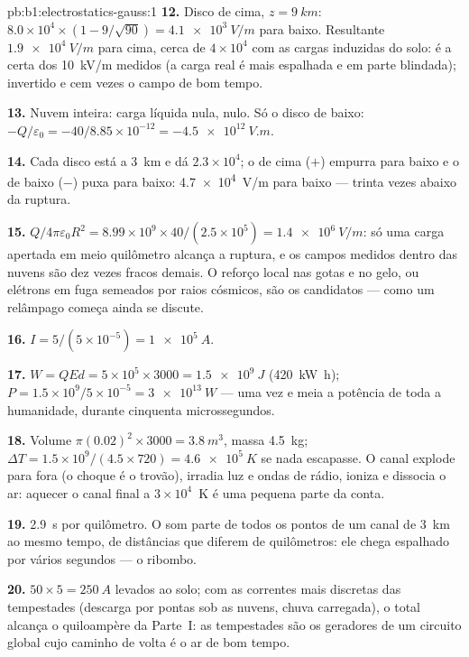 \begin{solution}{pb:b1:electrostatics-gauss:1}
\textbf{12.} Disco de cima, $z = \qty{9}{km}$: $8.0 \times 10^4 \times (1 - 9/\sqrt{90}) =
\qty{4.1e3}{V/m}$ para baixo. Resultante $\qty{1.9e4}{V/m}$ para cima, cerca de $4 \times 10^4$
com as cargas induzidas do solo: é a  certa dos \qty{10}{kV/m}
medidos (a carga real é mais espalhada e em parte blindada);
invertido e cem vezes o campo de bom tempo.

\textbf{13.} Nuvem inteira: carga líquida nula,  nulo. Só o disco de baixo:
$-Q/\varepsilon_0 = -40/8.85 \times 10^{-12} = \qty{-4.5e12}{V.m}$.

\textbf{14.} Cada disco está a \qty{3}{km} e dá $2.3 \times 10^4$; o de
cima ($+$) empurra para baixo e o de baixo ($-$) puxa para baixo: \qty{4.7e4}{V/m}
para baixo --- trinta vezes abaixo da ruptura.

\textbf{15.} $Q/4\pi\varepsilon_0R^2 = 8.99 \times 10^9 \times 40/(2.5 \times 10^5) =
\qty{1.4e6}{V/m}$: só uma carga apertada em meio quilômetro alcança a
ruptura, e os campos medidos dentro das nuvens são dez vezes fracos demais. O reforço
local nas gotas e no gelo, ou elétrons em fuga semeados por raios
cósmicos, são os candidatos --- como um relâmpago começa ainda se discute.

\textbf{16.} $I = 5/(5 \times 10^{-5}) = \qty{1e5}{A}$.

\textbf{17.} $W = QEd = 5 \times 10^5 \times 3000 = \qty{1.5e9}{J}$ (\qty{420}{kW h});
$P = 1.5 \times 10^9/5 \times 10^{-5} = \qty{3e13}{W}$ --- uma vez e meia
a potência de toda a humanidade, durante cinquenta microssegundos.

\textbf{18.} Volume $\pi(0.02)^2 \times 3000 = \qty{3.8}{m^3}$, massa \qty{4.5}{kg};
$\Delta T = 1.5 \times 10^9/(4.5 \times 720) = \qty{4.6e5}{K}$ se nada escapasse.
O canal explode para fora (o choque é o trovão), irradia luz
e ondas de rádio, ioniza e dissocia o ar: aquecer o canal final
a $3 \times 10^4$~K é uma pequena parte da conta.

\textbf{19.} \qty{2.9}{s} por quilômetro. O som parte de todos os pontos de um
canal de \qty{3}{km} ao mesmo tempo, de distâncias que diferem de quilômetros: ele
chega espalhado por vários segundos --- o ribombo.

\textbf{20.} $50 \times 5 = \qty{250}{A}$ levados ao solo; com as
correntes mais discretas das tempestades (descarga por pontas sob as nuvens, chuva carregada), o
total alcança o quiloampère da Parte~I: as tempestades são os geradores de um
circuito global cujo caminho de volta é o ar de bom tempo.


\end{solution}
